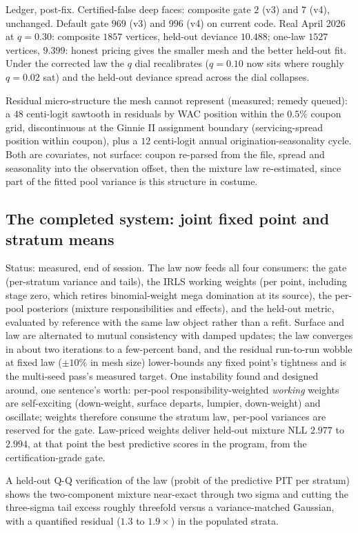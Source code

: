 \documentclass[11pt]{article}
\begin{document}
Ledger, post-fix. Certified-false deep faces: composite gate $2$ (v3)
and $7$ (v4), unchanged. Default gate $969$ (v3) and $996$ (v4)
on current code. Real April 2026 at $q=0.30$: composite $1857$
vertices, held-out deviance $10.488$; one-law $1527$ vertices,
$9.399$: honest pricing gives the smaller mesh and the better held-out
fit. Under the corrected law the $q$ dial recalibrates
($q=0.10$ now sits where roughly $q=0.02$ sat) and the held-out
deviance spread across the dial collapses.

Residual micro-structure the mesh cannot represent (measured; remedy
queued): a $48$ centi-logit sawtooth in residuals by WAC position
within the $0.5\%$ coupon grid, discontinuous at the Ginnie II
assignment boundary (servicing-spread position within coupon), plus a
$12$ centi-logit annual origination-seasonality cycle. Both are
covariates, not surface: coupon re-parsed from the file, spread and
seasonality into the observation offset, then the mixture law
re-estimated, since part of the fitted pool variance is this structure
in costume.


\subsection*{The completed system: joint fixed point and stratum means}

Status: measured, end of session. The law now feeds all four consumers:
the gate (per-stratum variance and tails), the IRLS working weights
(per point, including stage zero, which retires binomial-weight mega
domination at its source), the per-pool posteriors (mixture
responsibilities and effects), and the held-out metric, evaluated by
reference with the same law object rather than a refit. Surface and law
are alternated to mutual consistency with damped updates; the law
converges in about two iterations to a few-percent band, and the
residual run-to-run wobble at fixed law ($\pm10\%$ in mesh size)
lower-bounds any fixed point's tightness and is the multi-seed pass's
measured target. One instability found and designed around, one
sentence's worth: per-pool responsibility-weighted \emph{working}
weights are self-exciting (down-weight, surface departs, lumpier,
down-weight) and oscillate; weights therefore consume the stratum law,
per-pool variances are reserved for the gate. Law-priced weights
deliver held-out mixture NLL $2.977$ to $2.994$, at that point the best
predictive scores in the program, from the certification-grade gate.

A held-out Q-Q verification of the law (probit of the predictive PIT
per stratum) shows the two-component mixture near-exact through two
sigma and cutting the three-sigma tail excess roughly threefold versus
a variance-matched Gaussian, with a quantified residual ($1.3$ to
$1.9\times$) in the populated strata.
\end{document}
